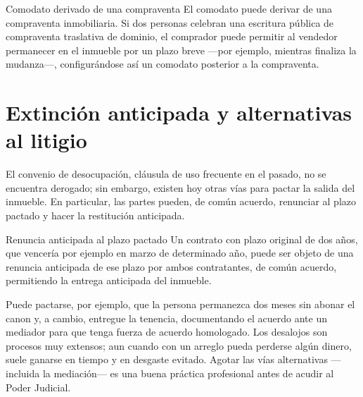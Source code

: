 \documentclass[12pt,oneside]{book}
\begin{document}
\begin{example}{Comodato derivado de una compraventa}
El comodato puede derivar de una compraventa inmobiliaria. Si dos personas celebran una escritura pública de compraventa traslativa de dominio, el comprador puede permitir al vendedor permanecer en el inmueble por un plazo breve ---por ejemplo, mientras finaliza la mudanza---, configurándose así un comodato posterior a la compraventa.
\end{example}

\section{Extinción anticipada y alternativas al litigio}

El convenio de desocupación, cláusula de uso frecuente en el pasado, no se encuentra derogado; sin embargo, existen hoy otras vías para pactar la salida del inmueble. En particular, las partes pueden, de común acuerdo, renunciar al plazo pactado y hacer la restitución anticipada.

\begin{example}{Renuncia anticipada al plazo pactado}
Un contrato con plazo original de dos años, que vencería por ejemplo en marzo de determinado año, puede ser objeto de una renuncia anticipada de ese plazo por ambos contratantes, de común acuerdo, permitiendo la entrega anticipada del inmueble.
\end{example}

\begin{important}
Puede pactarse, por ejemplo, que la persona permanezca dos meses sin abonar el canon y, a cambio, entregue la tenencia, documentando el acuerdo ante un mediador para que tenga fuerza de acuerdo homologado. Los desalojos son procesos muy extensos; aun cuando con un arreglo pueda perderse algún dinero, suele ganarse en tiempo y en desgaste evitado. Agotar las vías alternativas ---incluida la mediación--- es una buena práctica profesional antes de acudir al Poder Judicial.
\end{important}
\end{document}
